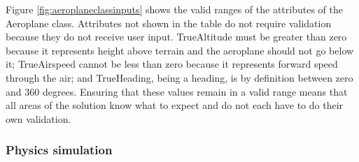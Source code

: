 \documentclass{article}
\begin{document}
Figure \ref{fig:aeroplaneclassinputs} shows the valid ranges of the attributes of the Aeroplane class.
Attributes not shown in the table do not require validation because they do not receive user input.
TrueAltitude must be greater than zero because it represents height above terrain and the aeroplane should not go below it; TrueAirspeed cannot be less than zero because it represents forward speed through the air; and TrueHeading, being a heading, is by definition between zero and 360 degrees.
Ensuring that these values remain in a valid range means that all areas of the solution know what to expect and do not each have to do their own validation.

\subsubsection{Physics simulation}
\end{document}
